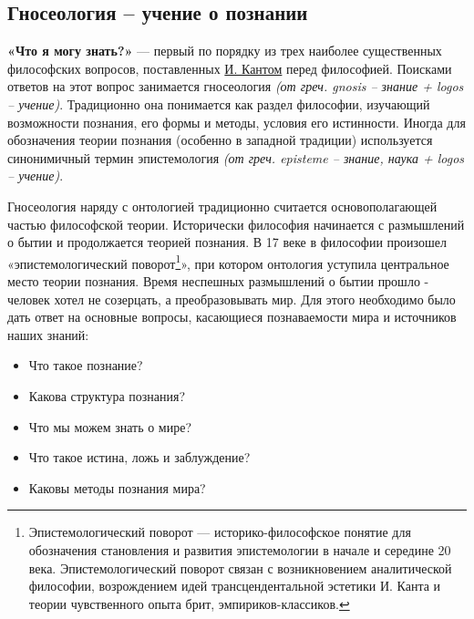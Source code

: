 \documentclass[
]{article}
\providecommand{\tightlist}{%
  \setlength{\itemsep}{0pt}\setlength{\parskip}{0pt}}
\begin{document}
\hypertarget{ux433ux43dux43eux441ux435ux43eux43bux43eux433ux438ux44f-ux443ux447ux435ux43dux438ux435-ux43e-ux43fux43eux437ux43dux430ux43dux438ux438}{%
\subsection{Гносеология -- учение о
познании}\label{ux433ux43dux43eux441ux435ux43eux43bux43eux433ux438ux44f-ux443ux447ux435ux43dux438ux435-ux43e-ux43fux43eux437ux43dux430ux43dux438ux438}}

\textbf{«Что я могу знать?»} --- первый по порядку из трех наиболее
существенных философских вопросов, поставленных
\href{https://ru.wikipedia.org/wiki/\%D0\%9A\%D0\%B0\%D0\%BD\%D1\%82,_\%D0\%98\%D0\%BC\%D0\%BC\%D0\%B0\%D0\%BD\%D1\%83\%D0\%B8\%D0\%BB}{И.
Кантом} перед философией. Поисками ответов на этот вопрос занимается
гносеология \emph{(от греч. gnosis -- знание + logos -- учение)}.
Традиционно она понимается как раздел философии, изучающий возможности
познания, его формы и методы, условия его истинности. Иногда для
обозначения теории познания (особенно в западной традиции) используется
синонимичный термин эпистемология \emph{(от греч. episteme -- знание,
наука + logos -- учение)}.

Гносеология наряду с онтологией традиционно считается основополагающей
частью философской теории. Исторически философия начинается с
размышлений о бытии и продолжается теорией познания. В 17 веке в
философии произошел «эпистемологический поворот\footnote{Эпистемологический
  поворот --- историко-философское понятие для обозначения становления и
  развития эпистемологии в начале и середине 20 века. Эпистемологический
  поворот связан с возникновением аналитической философии, возрождением
  идей трансцендентальной эстетики И. Канта и теории чувственного опыта
  брит, эмпириков-классиков.}», при котором онтология уступила
центральное место теории познания. Время неспешных размышлений о бытии
прошло - человек хотел не созерцать, а преобразовывать мир. Для этого
необходимо было дать ответ на основные вопросы, касающиеся познаваемости
мира и источников наших знаний:

\begin{itemize}
\tightlist
\item
  Что такое познание?
\item
  Какова структура познания?
\item
  Что мы можем знать о мире?
\item
  Что такое истина, ложь и заблуждение?
\item
  Каковы методы познания мира?
\end{itemize}
\end{document}
